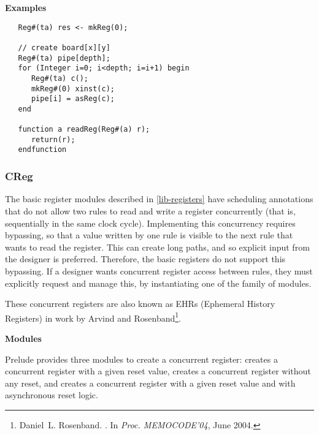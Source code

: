 {\bf Examples}

\begin{verbatim}
   Reg#(ta) res <- mkReg(0);

   // create board[x][y]
   Reg#(ta) pipe[depth];
   for (Integer i=0; i<depth; i=i+1) begin
      Reg#(ta) c();
      mkReg#(0) xinst(c);
      pipe[i] = asReg(c);
   end

   function a readReg(Reg#(a) r);
      return(r);
   endfunction
\end{verbatim}



\subsubsection{CReg}
\label{lib-creg}

The basic register modules described in \ref{lib-registers} have scheduling
annotations that do not allow two rules to read and write a register
concurrently (that is, sequentially in the same clock cycle).  Implementing
this concurrency requires bypassing, so that a value written by one rule is
visible to the next rule that wants to read the register.  This can create
long paths, and so explicit input from the designer is preferred.  Therefore,
the basic registers do not support this bypassing.  If a designer wants
concurrent register access between rules, they must explicitly request
and manage this, by instantiating one of the  family of modules.

These concurrent registers are also known as EHRs (Ephemeral History Registers)
in work by Arvind and Rosenband\footnote{Daniel~L. Rosenband.
.
\newblock In {\em Proc. MEMOCODE'04}, June 2004.}.

{\bf Modules}

Prelude provides three modules to create a concurrent register: 
creates a concurrent register with a given reset value,  creates
a concurrent register without any reset, and   creates a
concurrent register with a given reset value and with asynchronous reset logic.  

